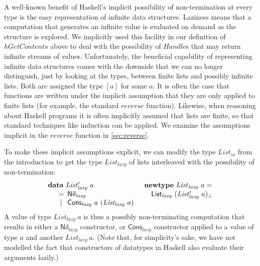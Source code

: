 \documentclass{jfp1}
\newcommand{\kw}[1]{\textbf{#1}}
\begin{document}
A well-known benefit of Haskell's implicit possibility of
non-termination at every type is the easy representation of infinite
data structures. Laziness means that a computation that generates an
infinite value is evaluated on demand as the structure is explored. We
implicitly used this facility in our definition of
$\mathit{hGetContents}$ above to deal with the possibility of
$\mathit{Handle}$s that may return infinite streams of
values. Unfortunately, the beneficial capability of representing
infinite data structures comes with the downside that we can no longer
distinguish, just by looking at the types, between finite lists and
possibly infinite lists. Both are assigned the type $[a]$ for some
$a$. It is often the case that functions are written under the
implicit assumption that they are only applied to finite lists (for
example, the standard $\mathit{reverse}$ function). Likewise, when
reasoning about Haskell programs it is often implicitly assumed that
lists are finite, so that standard techniques like induction can be
applied. We examine the assumptions implicit in the $\mathit{reverse}$
function in \autoref{sec:reverse}.

To make these implicit assumptions explicit, we can modify the type
$\mathit{List_{io}}$ from the introduction to get the type
$\mathit{List_{lazy}}$ of lists interleaved with the possibility of
non-termination:
\begin{displaymath}
  \begin{array}{ll}
    \kw{data}~\mathit{List'_{\mathit{lazy}}}~a
    &
    \kw{newtype}~\mathit{List}_{\mathit{lazy}}~a =
    \\
    \quad
    \begin{array}[t]{c@{\hspace{0.5em}}l}
      = & \mathsf{Nil_{\mathit{lazy}}} \\
      | & \mathsf{Cons_{\mathit{lazy}}}~a~(\mathit{List_{lazy}}~a) \\
    \end{array}
    &
    \quad \mathsf{List}_{\mathit{lazy}}~(\mathit{List'_{lazy}}~a)_\bot
  \end{array}
\end{displaymath}
A value of type $\mathit{List_{lazy}}~a$ is thus a possibly
non-terminating computation that results in either a
$\mathsf{Nil}_{\mathit{lazy}}$ constructor, or
$\mathsf{Cons}_{\mathit{lazy}}$ constructor applied to a value of type
$a$ and another $\mathit{List_{lazy}}~a$. (Note that, for simplicity's
sake, we have not modelled the fact that constructors of datatypes in
Haskell also evaluate their arguments lazily.)
\end{document}
